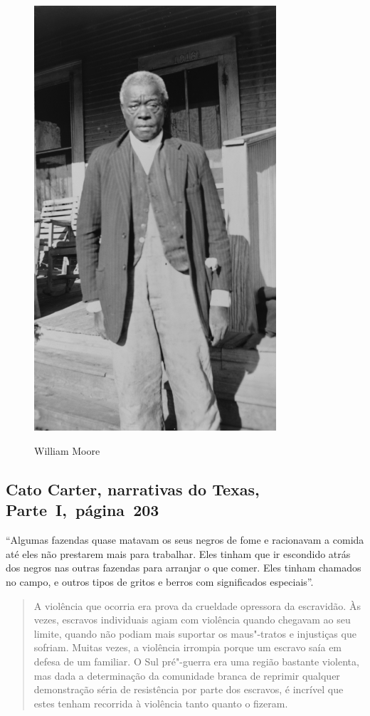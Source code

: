 \pagebreak
\thispagestyle{empty}

\begin{figure}[H]
\centering
 \includegraphics[width=90mm]{./imgs/williammoore_recorte.jpg} \label{img19}
\caption{William Moore}
\end{figure}

\subsection{Cato Carter, narrativas do Texas, Parte~I,~página~203} \label{ref53}

``Algumas fazendas quase matavam os seus negros de fome e racionavam a
comida até eles não prestarem mais para trabalhar. Eles tinham que ir
escondido atrás dos negros nas outras fazendas para arranjar o que
comer. Eles tinham chamados no campo, e outros tipos de gritos e berros
com significados especiais''.

\begin{quote}
A violência que ocorria era prova da crueldade opressora da
escravidão. Às vezes, escravos individuais agiam com violência quando
chegavam ao seu limite, quando não podiam mais suportar os maus"-tratos e
injustiças que sofriam. Muitas vezes, a violência irrompia porque um
escravo saía em defesa de um familiar. O Sul pré"-guerra era uma região
bastante violenta, mas dada a determinação da comunidade branca de
reprimir qualquer demonstração séria de resistência por parte dos
escravos, é incrível que estes tenham recorrida à violência tanto quanto
o fizeram.
\end{quote}

